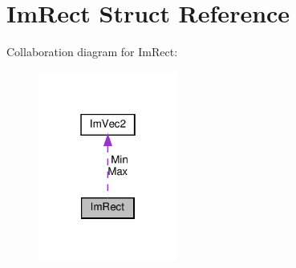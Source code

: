 \hypertarget{structImRect}{}\section{Im\+Rect Struct Reference}
\label{structImRect}


Collaboration diagram for Im\+Rect\+:\nopagebreak
\begin{figure}[H]
\begin{center}
\leavevmode
\includegraphics[width=130pt]{structImRect__coll__graph}
\end{center}
\end{figure}
